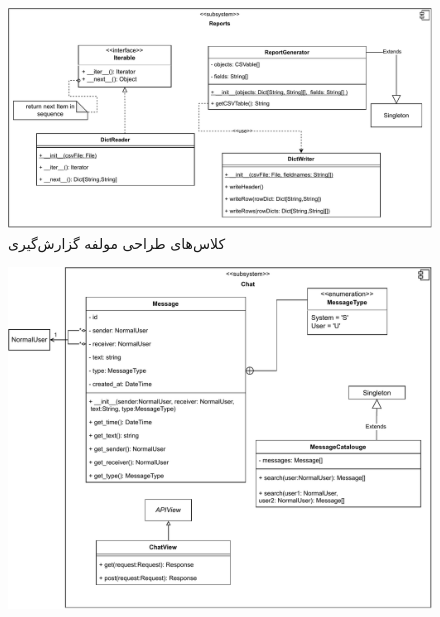 \eject  \pdfpagewidth=10in \pdfpageheight=10in

\begin{figure}[ht!]
	\centering
	\includegraphics[scale=0.8]{figs/design-class/reports.pdf}
	\caption{کلاس‌های طراحی مولفه گزارش‌گیری}
\end{figure}
\FloatBarrier
\newpage

\recalctypearea

\begin{figure}[ht!]
	\centering
	\includegraphics[scale=0.8]{figs/design-class/chat.pdf}
\end{figure}
\FloatBarrier
\newpage

\eject \pdfpagewidth=18in \pdfpageheight=18in

